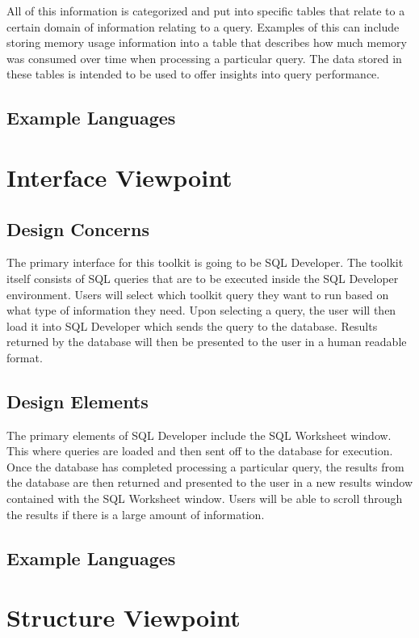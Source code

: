 \documentclass[draftclsnofoot, onecolumn, compsoc, 10pt]{IEEEtran}
\begin{document}
All of this information is categorized and put into specific tables that relate to a certain domain of information relating to a query.
Examples of this can include storing memory usage information into a table that describes how much memory was consumed over time when processing a particular query.
The data stored in these tables is intended to be used to offer insights into query performance.

\subsection{Example Languages}

\section{Interface Viewpoint}
\subsection{Design Concerns}
The primary interface for this toolkit is going to be SQL Developer. The toolkit itself consists of SQL queries that are to be executed inside the SQL Developer environment.
Users will select which toolkit query they want to run based on what type of information they need. Upon selecting a query, the user will then load it into SQL Developer which sends the query to the database.
Results returned by the database will then be presented to the user in a human readable format.

\subsection{Design Elements}
The primary elements of SQL Developer include the SQL Worksheet window.
This where queries are loaded and then sent off to the database for execution.
Once the database has completed processing a particular query, the results from the database are then returned and presented to the user in a new results window contained with the SQL Worksheet window.
Users will be able to scroll through the results if there is a large amount of information.

\subsection{Example Languages}

\section{Structure Viewpoint}
\end{document}
